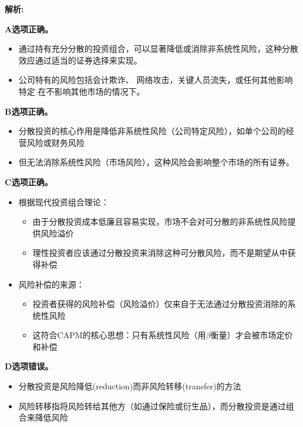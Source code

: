 \documentclass{article}
\newenvironment{explanation}
{\textbf{解析:}\par}
{\par}
\begin{document}
\begin{explanation}
    

    \textbf{A选项正确。}
    \begin{itemize}
        \item 通过持有充分分散的投资组合，可以显著降低或消除非系统性风险，这种分散效应通过适当的证券选择来实现。
        \item 公司特有的风险包括会计欺诈、
        网络攻击，关键人员流失，或任何其他影响特定
        在不影响其他市场的情况下。
    \end{itemize}

    \textbf{B选项正确。}
    \begin{itemize}
        \item 分散投资的核心作用是降低非系统性风险（公司特定风险），如单个公司的经营风险或财务风险
        \item 但无法消除系统性风险（市场风险），这种风险会影响整个市场的所有证券。
    \end{itemize}

    \textbf{C选项正确。}
    \begin{itemize}
        \item 根据现代投资组合理论：
        \begin{itemize}
            \item 由于分散投资成本低廉且容易实现，市场不会对可分散的非系统性风险提供风险溢价
            \item 理性投资者应该通过分散投资来消除这种可分散风险，而不是期望从中获得补偿
        \end{itemize}
        \item 风险补偿的来源：  
        \begin{itemize}
            \item 投资者获得的风险补偿（风险溢价）仅来自于无法通过分散投资消除的系统性风险
            \item 这符合CAPM的核心思想：只有系统性风险（用$\beta$衡量）才会被市场定价和补偿
        \end{itemize}
    \end{itemize}

    \textbf{D选项错误。}
    \begin{itemize}
        \item 分散投资是风险降低(reduction)而非风险转移(transfer)的方法
        \item 风险转移指将风险转给其他方（如通过保险或衍生品），而分散投资是通过组合来降低风险
    \end{itemize}

\end{explanation}
\end{document}
